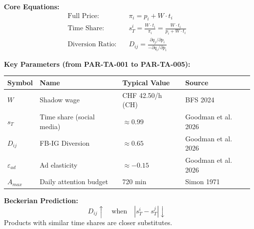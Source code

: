 
\begin{tcolorbox}[colback=blue!5!white, colframe=blue!75!black,
    title=Quick Reference: Time Allocation \& Platform Economics]

\textbf{Core Equations:}
\begin{align}
\text{Full Price:} \quad & \pi_i = p_i + W \cdot t_i \label{eq:pt-full-price} \\
\text{Time Share:} \quad & s_T^i = \frac{W \cdot t_i}{\pi_i} = \frac{W \cdot t_i}{p_i + W \cdot t_i} \label{eq:pt-time-share} \\
\text{Diversion Ratio:} \quad & D_{ij} = \frac{\partial q_j / \partial p_i}{-\partial q_i / \partial p_i} \label{eq:pt-diversion}
\end{align}

\textbf{Key Parameters (from PAR-TA-001 to PAR-TA-005):}
\begin{center}
\begin{tabular}{llll}
\toprule
Symbol & Name & Typical Value & Source \\
\midrule
$W$ & Shadow wage & CHF 42.50/h (CH) & BFS 2024 \\
$s_T$ & Time share (social media) & $\approx 0.99$ & Goodman et al. 2026 \\
$D_{ij}$ & FB-IG Diversion & $\approx 0.65$ & Goodman et al. 2026 \\
$\varepsilon_{ad}$ & Ad elasticity & $\approx -0.15$ & Goodman et al. 2026 \\
$A_{max}$ & Daily attention budget & 720 min & Simon 1971 \\
\bottomrule
\end{tabular}
\end{center}

\textbf{Beckerian Prediction:}
\[
D_{ij} \uparrow \quad \text{when} \quad |s_T^i - s_T^j| \downarrow
\]
Products with similar time shares are closer substitutes.

\end{tcolorbox}


